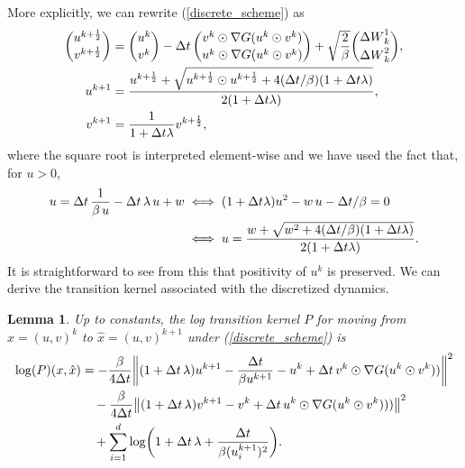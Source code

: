 \documentclass[11pt, twoside]{report}
\newtheorem{lemma}[theorem]{Lemma}
\begin{document}
More explicitly, we can rewrite (\ref{discrete_scheme}) as
\begin{align*}
    \binom{u^{k+\frac12}}{v^{k+\frac12}} &= \binom{u^k}{v^k} - {\Delta t} \,\binom{v^k \odot \nabla G(u^k\odot v^k)}{u^k \odot \nabla G(u^k\odot v^k)}  + \sqrt{\frac{2}{\beta}}
    \binom{{\Delta W}^1_k}{{\Delta W}^2_k},\\
    u^{k+1} &=  \frac{ u^{k+\frac12} + \sqrt{ u^{k+\frac12}\odot u^{k+\frac 12} + 4({\Delta t}/\beta) (1+{\Delta t}\lambda) }}{2(1+{\Delta t}\lambda)}, \\
    v^{k+1} &= \frac{1}{1+{\Delta t}\lambda} v^{k+\frac12},
\end{align*}
where the square root is interpreted element-wise and we have used the fact that, for $u>0$,
 \begin{align*}
 u = {\Delta t} \,\frac{1}{\beta\,u} - {\Delta t}\, \lambda\, u + w &\iff (1+{\Delta t} \lambda) u^2  - w\, u -{\Delta t}/\beta  = 0\\ &\iff u =\frac{ w + \sqrt{ w^2 + 4({\Delta t}/\beta) (1+{\Delta t} \lambda) }}{2(1+{\Delta t} \lambda)}.
 \end{align*}
 It is straightforward to see from this that positivity of $u^k$ is preserved. We can derive the transition kernel associated with the discretized dynamics.
 \begin{lemma}\label{lem:transition_densities}
Up to constants, the log transition kernel $P$ for  moving from $x = (u,v)^k$  to $\hat x= (u,v)^{k+1}$ under (\ref{discrete_scheme}) is
\begin{align*}
    \log(P)(x, \hat x) &= -\frac{\beta}{4\tstep} \norm{   (1+\tstep\,\lambda) u^{k+1} - \frac{\tstep}{\beta u^{k+1}} - u^k  + \tstep\, v^k\odot \nabla G(u^k\odot v^k) ) }^2\\
    &\quad -\frac{\beta}{4\tstep} \norm{   (1+\tstep\,\lambda) v^{k+1}  - v^{k}  + \tstep\, u^k\odot \nabla G(u^k\odot v^k)) ) }^2\\
    &\quad + \sum_{i=1}^d\log\pa{ 1+\tstep\,\lambda + \frac{\tstep}{\beta  (u^{k+1}_i)^2}}.
\end{align*}
\end{lemma}
\end{document}
